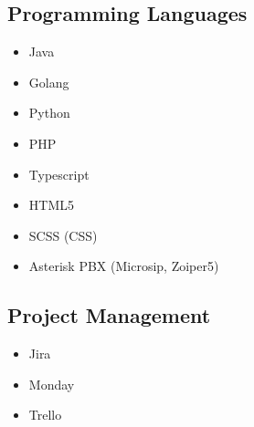 
\begin{cventries}
\begin{row}[cellsep=0.75cm]{2}{2}
    \begin{cell}{1}
	\section*{Programming Languages}
	\vspace{-1.5ex}
    \begin{itemize}
        \item {Java}
        \item {Golang}
        \item {Python}
        \item {PHP}
        \item {Typescript}
        \item {HTML5}
        \item {SCSS (CSS)}
        \item {Asterisk PBX (Microsip, Zoiper5)}
    \end{itemize}
	\end{cell}
	\begin{cell}{1}
	\section*{Project Management}
	\vspace{-1.5ex}
    \begin{itemize}
        \item {Jira}
        \item {Monday}
        \item {Trello}
    \end{itemize}
	\end{cell}
\end{row}


\end{cventries}

